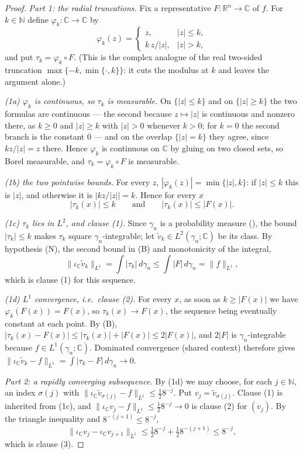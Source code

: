 \begin{proof}
\emph{Part 1: the radial truncations.}
Fix a representative $F : \mathbb{R}^n \to \mathbb{C}$ of $f$.  For
$k \in \mathbb{N}$ define $\varphi_k : \mathbb{C} \to \mathbb{C}$ by
\[
  \varphi_k(z) = \begin{cases} z, & |z| \leq k, \\[2pt]
    k\,z/|z|, & |z| > k, \end{cases}
\]
and put $\tau_k = \varphi_k \circ F$.  (This is the complex analogue of the real
two-sided truncation $\max\{-k,\min\{\cdot,k\}\}$: it cuts the modulus at $k$ and
leaves the argument alone.)

\emph{(1a) $\varphi_k$ is continuous, so $\tau_k$ is measurable.}  On
$\{|z| \leq k\}$ and on $\{|z| \geq k\}$ the two formulas are continuous --- the
second because $z \mapsto |z|$ is continuous and nonzero there, as $k \geq 0$ and
$|z| \geq k$ with $|z| > 0$ whenever $k > 0$; for $k = 0$ the second branch is
the constant $0$ --- and on the overlap $\{|z| = k\}$ they agree, since
$k z/|z| = z$ there.  Hence $\varphi_k$ is continuous on $\mathbb{C}$ by gluing
on two closed sets, so Borel measurable, and $\tau_k = \varphi_k \circ F$ is
measurable.

\emph{(1b) the two pointwise bounds.}  For every $z$, $|\varphi_k(z)|
= \min\{|z|, k\}$: if $|z| \leq k$ this is $|z|$, and otherwise it is
$|k z/|z|| = k$.  Hence for every $x$
\begin{equation*}
  |\tau_k(x)| \leq k \qquad\text{and}\qquad |\tau_k(x)| \leq |F(x)| . \tag{B}
\end{equation*}

\emph{(1c) $\tau_k$ lies in $L^2$, and clause (1).}  Since $\gamma_n$ is a
probability measure (), the bound $|\tau_k| \leq k$ makes
$\tau_k$ square $\gamma_n$-integrable; let
$\tilde v_k \in L^2(\gamma_n;\mathbb{C})$ be its class.  By hypothesis (N), the
second bound in (B) and monotonicity of the integral,
\[
  \|\iota_{\mathbb{C}}\tilde v_k\|_{L^1} = \int|\tau_k|\,d\gamma_n
    \leq \int|F|\,d\gamma_n = \|f\|_{L^1} ,
\]
which is clause (1) for this sequence.

\emph{(1d) $L^1$ convergence, i.e.\ clause (2).}  For every $x$, as soon as
$k \geq |F(x)|$ we have $\varphi_k(F(x)) = F(x)$, so $\tau_k(x) \to F(x)$, the
sequence being eventually constant at each point.  By (B),
$|\tau_k(x) - F(x)| \leq |\tau_k(x)| + |F(x)| \leq 2|F(x)|$, and $2|F|$ is
$\gamma_n$-integrable because $f \in L^1(\gamma_n;\mathbb{C})$.  Dominated
convergence (shared context) therefore gives
$\|\iota_{\mathbb{C}}\tilde v_k - f\|_{L^1} = \int|\tau_k - F|\,d\gamma_n \to 0$.

\emph{Part 2: a rapidly converging subsequence.}
By (1d) we may choose, for each $j \in \mathbb{N}$, an index $\sigma(j)$ with
$\|\iota_{\mathbb{C}}\tilde v_{\sigma(j)} - f\|_{L^1} \leq \tfrac12 8^{-j}$.  Put
$v_j = \tilde v_{\sigma(j)}$.  Clause (1) is inherited from (1c), and
$\|\iota_{\mathbb{C}} v_j - f\|_{L^1} \leq \tfrac12 8^{-j} \to 0$ is clause (2)
for $(v_j)$.  By the triangle inequality and $8^{-(j+1)} \leq 8^{-j}$,
\[
  \|\iota_{\mathbb{C}} v_j - \iota_{\mathbb{C}} v_{j+1}\|_{L^1}
    \leq \tfrac12 8^{-j} + \tfrac12 8^{-(j+1)} \leq 8^{-j} ,
\]
which is clause (3).
\end{proof}
